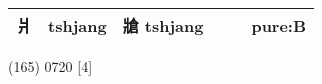\documentclass[14pt,a4paper]{scrartcl}
\begin{document}
\begin{longtable}[c]{@{}llllll@{}}
\begin{minipage}[t]{0.14\columnwidth}\raggedright\strut
爿
\strut\end{minipage} &
\begin{minipage}[t]{0.14\columnwidth}\raggedright\strut
tshjang
\strut\end{minipage} &
\begin{minipage}[t]{0.14\columnwidth}\raggedright\strut
牄 tshjang
\strut\end{minipage} &
\begin{minipage}[t]{0.14\columnwidth}\raggedright\strut
\strut\end{minipage} &
\begin{minipage}[t]{0.14\columnwidth}\raggedright\strut
\strut\end{minipage} &
\begin{minipage}[t]{0.14\columnwidth}\raggedright\strut
pure:B
\strut\end{minipage}\tabularnewline
\bottomrule
\end{longtable}

(165) 0720 {[}4{]}
\end{document}
